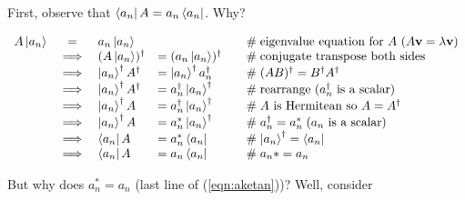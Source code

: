 \documentclass[11pt, oneside]{article}   	%
\begin{document}
\bigskip
\noindent

First, observe that $ \bra{a_n} A = a_n \bra{a_n}$. Why? 

\begin{equation}
\begin{array}{rcllll}
A \ket{a_n}
&=& a_n \ket{a_n}                                                                                                       && \quad \mathrel{\#} \text{eigenvalue equation for $A$ } (A \textbf{v} = \lambda \mathbf{v})  \\
&\implies& (A \ket{a_n})^{\dagger}               &= (a_n \ket{a_n})^{\dagger}                    & \quad \mathrel{\#} \text{conjugate transpose both sides} \\
&\implies& \ket{a_n}^{\dagger} A^{\dagger} &= \ket{a_n}^{\dagger} a_n^{\dagger}       & \quad \mathrel{\#} (AB)^\dagger = B^\dagger A^\dagger \\
&\implies& \ket{a_n}^{\dagger} A^{\dagger} &= a_n^{\dagger} \ket{a_n}^{\dagger}       & \quad \mathrel{\#} \text{rearrange ($a_n^\dagger$ is a scalar)} \\
&\implies& \ket{a_n}^{\dagger} A                 &= a_n^{\dagger} \ket{a_n}^{\dagger}       & \quad \mathrel{\#} \text{$A$ is Hermitean so $A = A^\dagger$} \\
&\implies& \ket{a_n}^{\dagger} A                 & = a_n^{*} \ket{a_n}^{\dagger}                 & \quad \mathrel{\#} a_n^{\dagger} = a_n^* \; \text{($a_n$ is a scalar)} \\
&\implies& \bra{a_n} A                                 &= a_n^{*} \bra{a_n}                                  & \quad \mathrel{\#} \ket{a_n}^{\dagger} = \bra{a_n} \\
&\implies& \bra{a_n} A                                 &= a_n  \bra{a_n}                                      & \quad \mathrel{\#} a_n* = a_n
\label{eqn:aketan}
\end{array}
\end{equation}

\bigskip
\noindent
But why does $a_n^* = a_n$ (last line of (\ref{eqn:aketan}))? Well, consider
\end{document}
